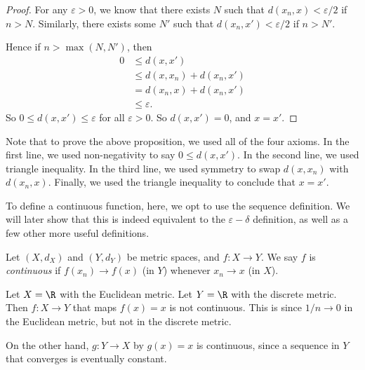 \documentclass[a4paper]{article}
\begin{document}
\begin{proof}
  For any $\varepsilon > 0$, we know that there exists $N$ such that $d(x_n, x) < \varepsilon/2$ if $n > N$. Similarly, there exists some $N'$ such that $d(x_n, x') < \varepsilon/2$ if $n > N'$.

  Hence if $n > \max(N, N')$, then
  \begin{align*}
    0 &\leq d(x, x')\\
    &\leq d(x, x_n) + d(x_n, x')\\
    &= d(x_n, x) + d(x_n, x')\\
    &\leq \varepsilon.
  \end{align*}
  So $0 \leq d(x, x') \leq \varepsilon$ for all $\varepsilon > 0$. So $d(x, x') = 0$, and $x = x'$.
\end{proof}

Note that to prove the above proposition, we used all of the four axioms. In the first line, we used non-negativity to say $0\leq d(x, x')$. In the second line, we used triangle inequality. In the third line, we used symmetry to swap $d(x, x_n)$ with $d(x_n, x)$. Finally, we used the triangle inequality to conclude that $x = x'$.

To define a continuous function, here, we opt to use the sequence definition. We will later show that this is indeed equivalent to the $\varepsilon-\delta$ definition, as well as a few other more useful definitions.
\begin{defi}
  Let $(X, d_X)$ and $(Y, d_Y)$ be metric spaces, and $f:X \to Y$. We say $f$ is \emph{continuous} if $f(x_n) \to f(x)$ (in $Y$) whenever $x_n \to x$ (in $X$).
\end{defi}

\begin{eg}
  Let $X = \R$ with the Euclidean metric. Let $Y = \R$ with the discrete metric. Then
  $f:X \to Y$ that maps $f(x) = x$ is not continuous. This is since $1/n \to 0$ in the Euclidean metric, but not in the discrete metric.

  On the other hand, $g: Y\to X$ by $g(x) = x$ is continuous, since a sequence in $Y$ that converges is eventually constant.
\end{eg}
\end{document}
